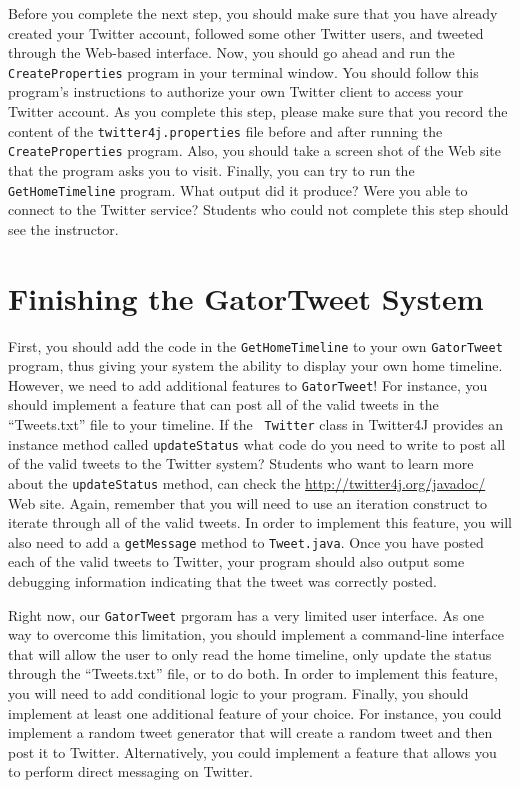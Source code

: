 Before you complete the next step, you should make sure that you have already created your Twitter account, followed some other
Twitter users, and tweeted through the Web-based interface. Now, you should go ahead and run the {\tt CreateProperties} program in
your terminal window.  You should follow this program's instructions to authorize your own Twitter client to access your Twitter
account.  As you complete this step, please make sure that you record the content of the {\tt twitter4j.properties} file before
and after running the {\tt CreateProperties} program.  Also, you should take a screen shot of the Web site that the program asks
you to visit. Finally, you can try to run the {\tt GetHomeTimeline} program.  What output did it produce? Were you able to connect
to the Twitter service? Students who could not complete this step should see the instructor.

\section*{Finishing the GatorTweet System}

  First, you should add the code in the {\tt GetHomeTimeline} to your own {\tt GatorTweet} program, thus giving your system the
  ability to display your own home timeline.  However, we need to add additional features to {\tt GatorTweet}!  For instance, you
  should implement a feature that can post all of the valid tweets in the ``Tweets.txt'' file to your timeline.  If the {\tt
  Twitter} class in Twitter4J provides an instance method called {\tt updateStatus} what code do you need to write to post all of
  the valid tweets to the Twitter system?  Students who want to learn more about the {\tt updateStatus} method, can check the
  \url{http://twitter4j.org/javadoc/} Web site.  Again, remember that you will need to use an iteration construct to iterate
  through all of the valid tweets.  In order to implement this feature, you will also need to add a {\tt getMessage} method to
  {\tt Tweet.java}. Once you have posted each of the valid tweets to Twitter, your program should also output some debugging
  information indicating that the tweet was correctly posted.  

  Right now, our {\tt GatorTweet} prgoram has a very limited user interface.  As one way to overcome this limitation, you should
  implement a command-line interface that will allow the user to only read the home timeline, only update the status through the
  ``Tweets.txt'' file, or to do both.  In order to implement this feature, you will need to add conditional logic to your program.
  Finally, you should implement at least one additional feature of your choice.  For instance, you could implement a random tweet
  generator that will create a random tweet and then post it to Twitter. Alternatively, you could implement a feature that allows
  you to perform direct messaging on Twitter.

